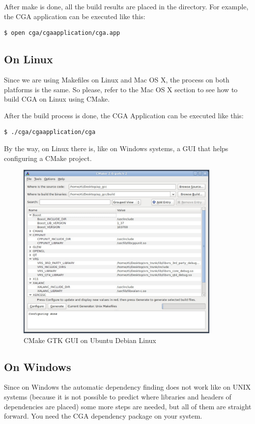 After make is done, all the build results are placed in the  directory. For example, the CGA application can be executed like this:
\begin{verbatim}
$ open cga/cgaapplication/cga.app
\end{verbatim}

\subsection{On Linux} Since we are using Makefiles on Linux and Mac OS X, the process on both platforms is the same. So please, refer to the Mac OS X section to see how to build CGA on Linux using CMake.

After the build process is done, the CGA Application can be executed like this:
\begin{verbatim}
$ ./cga/cgaapplication/cga
\end{verbatim}

By the way, on Linux there is, like on Windows systems, a GUI that helps configuring a CMake project.

\begin{figure}[ht]
\centering
\includegraphics[width=10cm]{images/cmake_gui_linux}
\caption{CMake GTK GUI on Ubuntu Debian Linux}\label{fig:cmake_gui_linux}
\end{figure}


\subsection{On Windows}
Since on Windows the automatic dependency finding does not work like on UNIX systems (because it is not possible to predict where libraries and headers of dependencies are placed) some more steps are needed, but all of them are straight forward. You need the CGA dependency package on your system.

